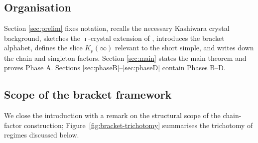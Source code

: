 \documentclass[11pt]{article}
\theoremstyle{definition}
\theoremstyle{remark}
\begin{document}
\subsection{Organisation}

Section \ref{sec:prelim} fixes notation, recalls the necessary Kashiwara crystal background,
sketches the $\imath$-crystal extension of \cite{Watanabe2107,Watanabe2110}, introduces the
bracket alphabet, defines the slice $K_p(\infty)$ relevant to the short simple, and writes
down the chain and singleton factors. Section \ref{sec:main} states the main theorem and
proves Phase A. Sections \ref{sec:phaseB}--\ref{sec:phaseD} contain Phases B--D.

\subsection{Scope of the bracket framework}\label{ssec:scope}

We close the introduction with a remark on the structural scope of the chain-factor
construction; Figure~\ref{fig:bracket-trichotomy} summarises the trichotomy of regimes
discussed below.
\end{document}
